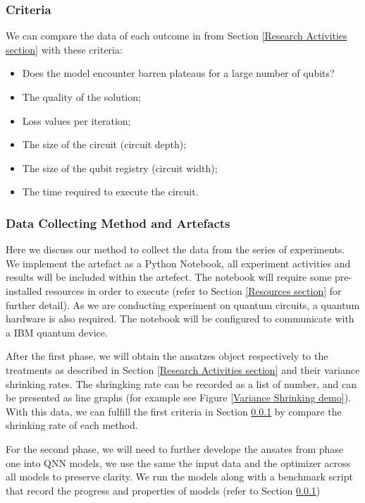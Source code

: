 \subsubsection{Criteria}
\label{Criteria section}
We can compare the data of each outcome in from Section \ref{Research Activities section} with these criteria:
\begin{itemize}
    \item Does the model encounter barren plateaus for a large number of qubits?
    \item The quality of the solution;
    \item Loss values per iteration;
    \item The size of the circuit (circuit depth);
    \item The size of the qubit registry (circuit width);
    \item The time required to execute the circuit.
\end{itemize}

\subsubsection{Data Collecting Method and Artefacts}
\label{Data Collecting Section}
Here we discuss our method to collect the data from the series of experiments.
We implement the artefact as a Python Notebook, all experiment activities and results will be included within the artefect.
The notebook will require some pre-installed resources in order to execute (refer to Section \ref{Resources section} for further detail).
As we are conducting experiment on quantum circuits, a quantum hardware is also required.
The notebook will be configured to communicate with a IBM quantum device.

After the first phase, we will obtain the ansatzes object respectively to the treatments as described in Section \ref{Research Activities section} and their variance shrinking rates.
The shringking rate can be recorded as a list of number, and can be presented as line graphs (for example see Figure \ref{Variance Shrinking demo}).
With this data, we can fulfill the first criteria in Section \ref{Criteria section} by compare the shrinking rate of each method.

For the second phase, we will need to further develope the ansates from phase one into QNN models, we use the same the input data and the optimizer across all models to preserve clarity.
We run the models along with a benchmark script that record the progress and properties of models (refer to Section \ref{Criteria section})

